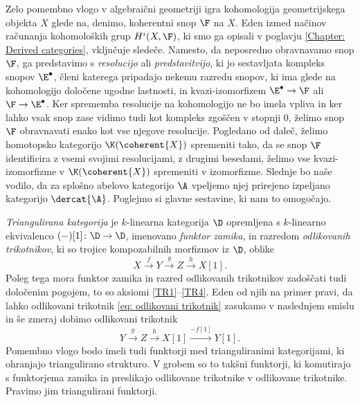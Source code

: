 Zelo pomembno vlogo v algebraični geometriji igra kohomologija geometrijskega objekta $X$ glede na, denimo, koherentni snop $\F$ na $X$. Eden izmed načinov računanja kohomoloških grup $H^i(X, \F)$, ki smo ga opisali v poglavju \ref{Chapter: Derived categories}, vključuje sledeče. 
Namesto, da 
neposredno obravnavamo snop $\F$, ga predstavimo s \ti \emph{resolucijo} ali \emph{predstavitvijo}, ki jo sestavljata kompleks snopov $\E^\bullet$, členi katerega pripadajo nekemu razredu snopov, ki ima glede na kohomologijo določene ugodne lastnosti, in kvazi-izomorfizem $\E^\bullet \to \F$ ali $\F \to \E^\bullet$. Ker sprememba resolucije na kohomologijo ne bo imela vpliva in ker lahko vsak snop zase vidimo tudi kot kompleks zgoščen v stopnji $0$, želimo snop $\F$ obravnavati enako kot vse njegove resolucije. 
Pogledano od daleč, želimo homotopsko kategorijo $\K(\coherent{X})$ spremeniti tako, da se snop $\F$ identificira z vsemi svojimi resolucijami, \oz z drugimi besedami, želimo vse kvazi-izomorfizme v $\K(\coherent{X})$ spremeniti v izomorfizme. Slednje bo naše vodilo, da za splošno abelovo kategorijo $\A$ vpeljemo njej prirejeno izpeljano kategorijo $\dercat{\A}$. Poglejmo si glavne sestavine, ki nam to omogočajo. 



\emph{Triangulirana kategorija} je $k$-linearna kategorija $\D$ opremljena s $k$-linearno ekvivalenco $(-)[1] \colon \D \to \D$, imenovano \emph{funktor zamika}, in razredom \emph{odlikovanih trikotnikov}, ki so trojice kompozabilnih morfizmov iz $\D$, oblike
\begin{equation}
    \label{eq: odlikovani trikotnik}
    X\xrightarrow{\ f \ } Y \xrightarrow{\ g \ } Z \xrightarrow{\ h \ } X[1].
\end{equation}
Poleg tega mora funktor zamika in razred odlikovanih trikotnikov zadoščati tudi določenim pogojem, to so aksiomi \ref{TR1}--\ref{TR4}. Eden od njih na primer pravi, da lahko odlikovani trikotnik \eqref{eq: odlikovani trikotnik} zasukamo v naslednjem smislu in še zmeraj dobimo odlikovani trikotnik
\[
    Y \xrightarrow{\ g \ } Z \xrightarrow{\ h \ } X[1] \xrightarrow{-f[1]} Y[1].
\]
Pomembno vlogo bodo imeli tudi funktorji med trianguliranimi kategorijami, ki ohranjajo triangulirano strukturo. V grobem so to takšni funktorji, ki komutirajo s funktorjema zamika in preslikajo odlikovane trikotnike v odlikovane trikotnike. Pravimo jim triangulirani funktorji.



